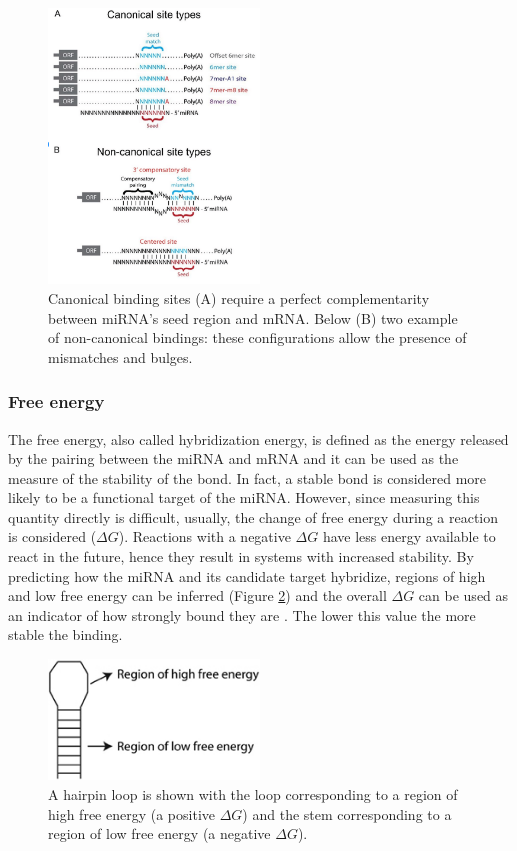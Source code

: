 \begin{figure}[hbt!]
	\centering
	\includegraphics[width=0.5\textwidth]{Figures/canonical_noncanonical}
	\caption{ Canonical binding sites (A) require a perfect complementarity between miRNA's seed region and mRNA. Below (B) two example of non-canonical bindings: these configurations allow the presence of mismatches and bulges.}
	\label{fig:canonical_binding}
\end{figure}

\subsubsection{Free energy}
The free energy, also called hybridization energy,  is defined as the energy released by the pairing between the miRNA and mRNA and it can be used as the measure of the stability of the bond. In fact, a stable bond is considered more likely to be a functional target of the miRNA. However, since measuring this quantity directly is difficult, usually, the change of free energy during a reaction is considered ($\Delta G$). Reactions with a negative $\Delta G$ have less energy available to react in the future, hence they result in systems with increased stability. By predicting how the miRNA and its candidate target hybridize, regions of high and low free energy can be inferred (Figure \ref{fig:free_energy}) and the overall $\Delta G$ can be used as an indicator of how strongly bound they are \cite{free_energy_survey}. The lower this value the more stable the binding.

\begin{figure}[hbt!]
	\centering
	\includegraphics[width=0.5\textwidth]{Figures/free_energy}
	\caption{ A hairpin loop is shown with the loop corresponding to a region of high free energy (a positive $\Delta G$) and the stem corresponding to a region of low free energy (a negative $\Delta G$).}
	\label{fig:free_energy}
\end{figure}

